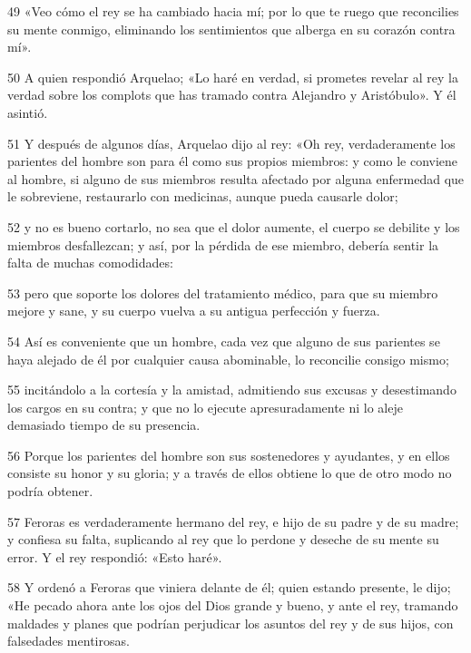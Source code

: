 \par 49 «Veo cómo el rey se ha cambiado hacia mí; por lo que te ruego que reconcilies su mente conmigo, eliminando los sentimientos que alberga en su corazón contra mí».

\par 50 A quien respondió Arquelao; «Lo haré en verdad, si prometes revelar al rey la verdad sobre los complots que has tramado contra Alejandro y Aristóbulo». Y él asintió.

\par 51 Y después de algunos días, Arquelao dijo al rey: «Oh rey, verdaderamente los parientes del hombre son para él como sus propios miembros: y como le conviene al hombre, si alguno de sus miembros resulta afectado por alguna enfermedad que le sobreviene, restaurarlo con medicinas, aunque pueda causarle dolor;

\par 52 y no es bueno cortarlo, no sea que el dolor aumente, el cuerpo se debilite y los miembros desfallezcan; y así, por la pérdida de ese miembro, debería sentir la falta de muchas comodidades:

\par 53 pero que soporte los dolores del tratamiento médico, para que su miembro mejore y sane, y su cuerpo vuelva a su antigua perfección y fuerza.

\par 54 Así es conveniente que un hombre, cada vez que alguno de sus parientes se haya alejado de él por cualquier causa abominable, lo reconcilie consigo mismo;

\par 55 incitándolo a la cortesía y la amistad, admitiendo sus excusas y desestimando los cargos en su contra; y que no lo ejecute apresuradamente ni lo aleje demasiado tiempo de su presencia.

\par 56 Porque los parientes del hombre son sus sostenedores y ayudantes, y en ellos consiste su honor y su gloria; y a través de ellos obtiene lo que de otro modo no podría obtener.

\par 57 Feroras es verdaderamente hermano del rey, e hijo de su padre y de su madre; y confiesa su falta, suplicando al rey que lo perdone y deseche de su mente su error. Y el rey respondió: «Esto haré».

\par 58 Y ordenó a Feroras que viniera delante de él; quien estando presente, le dijo; «He pecado ahora ante los ojos del Dios grande y bueno, y ante el rey, tramando maldades y planes que podrían perjudicar los asuntos del rey y de sus hijos, con falsedades mentirosas.

